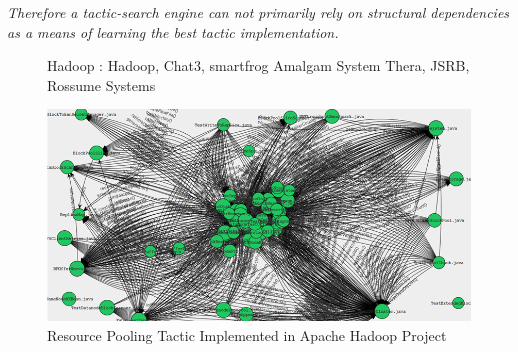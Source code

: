 \textit{Therefore a tactic-search engine can not primarily rely on structural dependencies as a means of learning the best tactic implementation.}

\begin{figure}[!htb]
\centering


\label{fig:HBall}
\caption[Heartbeat tactic in different systems]{Hadoop : Hadoop, Chat3, smartfrog Amalgam System Thera, JSRB, Rossume Systems}
\end{figure}

\begin{figure}[tbph]
\centering
\includegraphics[width=0.99\linewidth]{./img/Pooling}
\caption{Resource Pooling Tactic Implemented in Apache Hadoop Project}
\label{fig:Pooling}
\end{figure}


